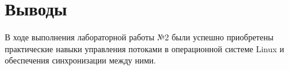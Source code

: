 \section{Выводы}

В ходе выполнения лабораторной работы №2 были успешно приобретены практические навыки управления потоками в операционной системе Linux и обеспечения синхронизации между ними.

\pagebreak
